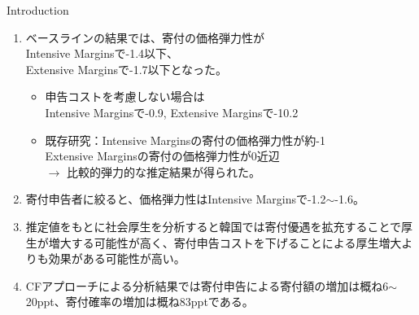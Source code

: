 \documentclass[dvipdfmx,10pt]{beamer}
\begin{document}
	\begin{frame}{Introduction}
	\protect\hypertarget{introduction-2}{}
	
	\begin{enumerate}
		\item ベースラインの結果では、寄付の価格弾力性が\\
		Intensive Marginsで-1.4以下、\\
		Extensive Marginsで-1.7以下となった。
		\begin{itemize}
			\item 申告コストを考慮しない場合は\\
			Intensive Marginsで-0.9, Extensive Marginsで-10.2
			\item 既存研究：Intensive Marginsの寄付の価格弾力性が約-1\\
			Extensive Marginsの寄付の価格弾力性が0近辺\\
			$\to$ 比較的弾力的な推定結果が得られた。
		\end{itemize}
		\item 寄付申告者に絞ると、価格弾力性はIntensive Marginsで-1.2\(\sim\)-1.6。
		\item 推定値をもとに社会厚生を分析すると韓国では寄付優遇を拡充することで厚生が増大する可能性が高く、寄付申告コストを下げることによる厚生増大よりも効果がある可能性が高い。
		\item CFアプローチによる分析結果では寄付申告による寄付額の増加は概ね6$\sim$20ppt、寄付確率の増加は概ね83pptである。
	\end{enumerate}
\end{frame}
\end{document}
